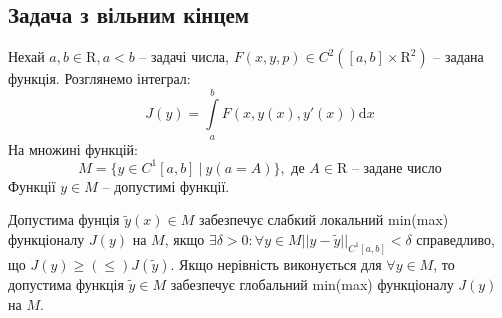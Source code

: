 \documentclass[14pt,a4paper]{scrartcl}
\theoremstyle{definition}
\theoremstyle{definition}
\theoremstyle{definition}
\begin{document}
\newpage

\section{}
\subsection{Задача з вільним кінцем}
Нехай $a, b \in \mathrm{R}, a < b$ -- задачі числа, $F(x, y, p) \in C^2([a, b] \times \mathrm{R}^2)$ -- задана функція. Розглянемо інтеграл: $$J(y) = \int\limits_{a}^{b}F(x, y(x), y'(x))\mathrm{d}x$$
На множині функцій: $$ M = \{ y \in C^1[a, b] \ | \ y(a = A)\}, \text{ де } A \in \mathrm{R} \text{ -- задане число} $$
Функції $y \in M$ -- допустимі функції.

 Допустима фунція $\tilde{y}(x) \in M$ забезпечує слабкий локальний min(max) функціоналу $J(y)$ на $M$, якщо $\exists \delta > 0 : \forall y \in M ||y - \tilde{y}||_{C^1[a, b]} < \delta$ справедливо, що $J(y) \geq (\leq) J(\tilde{y})$. Якщо нерівність виконується для $\forall y \in M$, то допустима функція $\tilde{y} \in M$ забезпечує глобальний min(max) функціоналу $J(y)$ на $M$.
\end{document}
